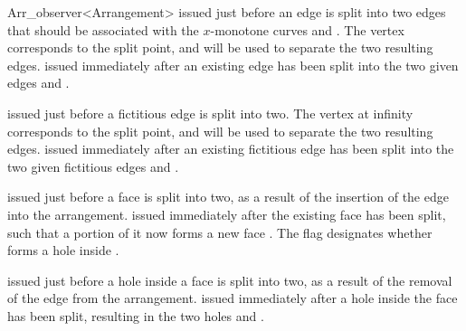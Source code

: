 \begin{ccRefClass}{Arr_observer<Arrangement>}
    {issued just before an edge  is split into two edges that should
     be associated with the $x$-monotone curves  and . The
     vertex  corresponds to the split point, and will be used to
     separate the two resulting edges.}
\ccGlue
{}
    {issued immediately after an existing edge has been split into the two
     given edges  and .}

    {issued just before a fictitious edge  is split into two. The
     vertex at infinity  corresponds to the split point, and will be
     used to separate the two resulting edges.}
\ccGlue
{}
    {issued immediately after an existing fictitious edge has been split into
     the two given fictitious edges  and .}

    {issued just before a face  is split into two, as a result of
     the insertion of the edge  into the arrangement.}
\ccGlue
{}
    {issued immediately after the existing face  has been split,
     such that a portion of it now forms a new face . The flag
      designates whether  forms a hole inside .}

    {issued just before a hole  inside a face  is split into
     two, as a result of the removal of the edge  from the arrangement.}
\ccGlue
{}
    {issued immediately after a hole inside the face  has been split,
     resulting in the two holes  and .}


\end{ccRefClass}
